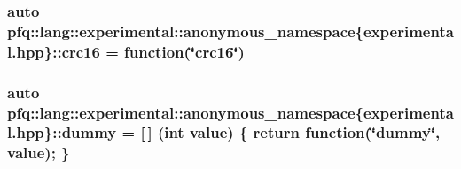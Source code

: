\subsubsection[{\texorpdfstring{crc16}{crc16}}]{\setlength{\rightskip}{0pt plus 5cm}auto pfq\+::lang\+::experimental\+::anonymous\+\_\+namespace\{experimental.\+hpp\}\+::crc16 = {\bf function}(\char`\"{}crc16\char`\"{})}\hypertarget{namespacepfq_1_1lang_1_1experimental_1_1anonymous__namespace_02experimental_8hpp_03_a8152d34c5c69cc26aaa2b4a14ed37af1}{}\label{namespacepfq_1_1lang_1_1experimental_1_1anonymous__namespace_02experimental_8hpp_03_a8152d34c5c69cc26aaa2b4a14ed37af1}
\subsubsection[{\texorpdfstring{dummy}{dummy}}]{\setlength{\rightskip}{0pt plus 5cm}auto pfq\+::lang\+::experimental\+::anonymous\+\_\+namespace\{experimental.\+hpp\}\+::dummy = \mbox{[}$\,$\mbox{]} (int value) \{ return {\bf function}(\char`\"{}dummy\char`\"{}, value); \}}\hypertarget{namespacepfq_1_1lang_1_1experimental_1_1anonymous__namespace_02experimental_8hpp_03_a5fc8274e9598b8524f833264174b62b7}{}\label{namespacepfq_1_1lang_1_1experimental_1_1anonymous__namespace_02experimental_8hpp_03_a5fc8274e9598b8524f833264174b62b7}
